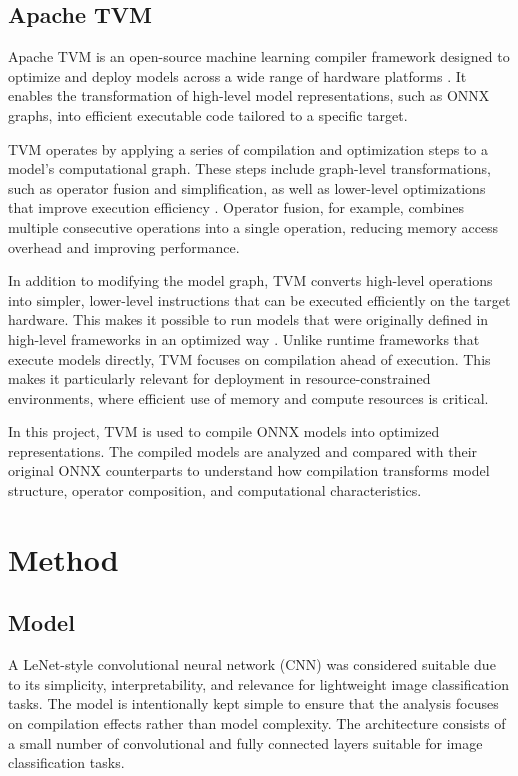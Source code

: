 \documentclass[fleqn,10pt]{olplainarticle}
\begin{document}
\subsection{Apache TVM}
Apache TVM is an open-source machine learning compiler framework designed to optimize and deploy models across a wide range of hardware platforms \cite{chen2018tvm}. It enables the transformation of high-level model representations, such as ONNX graphs, into efficient executable code tailored to a specific target.

TVM operates by applying a series of compilation and optimization steps to a model’s computational graph. These steps include graph-level transformations, such as operator fusion and simplification, as well as lower-level optimizations that improve execution efficiency \cite{chen2018tvm}. Operator fusion, for example, combines multiple consecutive operations into a single operation, reducing memory access overhead and improving performance.

In addition to modifying the model graph, TVM converts high-level operations into simpler, lower-level instructions that can be executed efficiently on the target hardware. This makes it possible to run models that were originally defined in high-level frameworks in an optimized way \cite{chen2018tvm}. Unlike runtime frameworks that execute models directly, TVM focuses on compilation ahead of execution. This makes it particularly relevant for deployment in resource-constrained environments, where efficient use of memory and compute resources is critical.

In this project, TVM is used to compile ONNX models into optimized representations. The compiled models are analyzed and compared with their original ONNX counterparts to understand how compilation transforms model structure, operator composition, and computational characteristics.

\newpage
\section{Method}

\subsection{Model}
A LeNet-style \cite{lecun1998gradient} convolutional neural network (CNN) was considered suitable due to its simplicity, interpretability, and relevance for lightweight image classification tasks. The model is intentionally kept simple to ensure that the analysis focuses on compilation effects rather than model complexity. The architecture consists of a small number of convolutional and fully connected layers suitable for image classification tasks.
\end{document}
